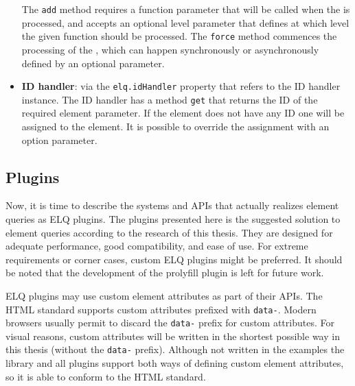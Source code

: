 \documentclass[a4paper,11pt]{kth-mag}
\newcommand{\code}[1]{\texttt{#1}}
\newcommand\abbr[2][]{\uppercase{#2}\ifthenelse{\equal{#1}{}}%
                     {}{#1}}
\begin{document}
\begin{itemize}
            The \code{add} method requires a function parameter that will be called when the  is processed, and accepts an optional level parameter that defines at which level the given function should be processed.
            The \code{force} method commences the processing of the , which can happen synchronously or asynchronously defined by an optional parameter.
          \item
            \textbf{\abbr{ID} handler}: via the \code{elq.idHandler} property that refers to the \abbr{ID} handler instance. 
            The \abbr{ID} handler has a method \code{get} that returns the \abbr{ID} of the required element parameter.
            If the element does not have any \abbr{ID} one will be assigned to the \gls{element}.
            It is possible to override the assignment with an option parameter.
        \end{itemize}
      \subsection{Plugins}
        Now, it is time to describe the systems and \glspl{API} that actually realizes element queries as \gls{ELQ} plugins.
        The plugins presented here is the suggested solution to element queries according to the research of this thesis.
        They are designed for adequate performance, good compatibility, and ease of use.
        For extreme requirements or corner cases, custom \gls{ELQ} plugins might be preferred.
        It should be noted that the development of the prolyfill plugin is left for future work.

        \Gls{ELQ} plugins may use custom element attributes as part of their \glspl{API}.
        The \gls{HTML} standard supports custom attributes prefixed with \code{data-}.
        Modern \glspl{browser} usually permit to discard the \code{data-} prefix for custom attributes.
        For visual reasons, custom attributes will be written in the shortest possible way in this thesis (without the \code{data-} prefix).
        Although not written in the examples the library and all plugins support both ways of defining custom \gls{element} attributes, so it is able to conform to the \gls{HTML} standard.
\end{document}
